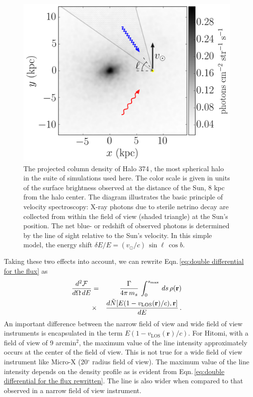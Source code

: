 \documentclass[aps,prd,10pt,twocolumn,superscriptaddress,showpacs]{revtex4-1}
\newcommand{\br}[0]{\mathbf{r}}
\newcommand{\los}[0]{\mathrm{LOS}}
\begin{document}
\begin{figure}[!h]
\centering
\includegraphics[width=0.99\columnwidth]{vspec_diagram.png}
\caption{The projected column density of Halo 374\,\cite{mao2015}, the most spherical halo in the suite of	simulations used here. The color scale is given in units of the surface brightness observed at the distance of the Sun, 8 kpc from the halo center. The diagram illustrates the basic principle of velocity spectroscopy: X-ray photons due to sterile netrino decay are collected from within the field of view (shaded triangle) at the Sun's position. The net blue- or redshift of observed photons is determined by the line of sight relative to the Sun's velocity. In this simple model, the energy shift $\delta E/E=(v_\odot/c)\,\sin\ell\,\cos b$.}
\label{fig:halo374}
\end{figure}

Taking these two effects into account, we can rewrite Eqn.\,\ref{eq:double differential for the flux} as 
\begin{eqnarray}
\dfrac{d^2 \mathcal{F}}{d\Omega \, dE} &=&  \dfrac{\Gamma}{4\pi \, m_s} \, \int _0 ^{s_{\rm
max}}  \, ds \, \rho(\br) \nonumber\\
&\times& \dfrac{d \tilde{N}[E(1 - v_\los(\br)/c), \br]}{dE} \,.
\label{eq:double differential for the flux rewritten}
\end{eqnarray}
An important difference between the narrow field of view and wide field of view instruments is
encapsulated in the term $E(1 - v_\los(\br)/c)$.  For Hitomi, with a field of view of 9 arcmin$^2$, the maximum value of the line intensity approximately occurs at the center of the field of view.  This is not true for a wide field of view instrument like Micro-X (20$^\circ$ radius field of view).  The maximum value of the line intensity depends on the density profile as is evident from Eqn.\,\ref{eq:double differential for the flux rewritten}.  The line is also wider when compared to that observed in a narrow field of view instrument.    
\end{document}
